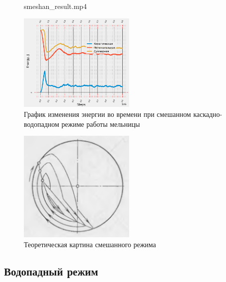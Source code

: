 \documentclass[c]{beamer}  %
\begin{document}
\begin{frame}
\frametitle{\insertsection} 
\framesubtitle{\insertsubsection}

\begin{figure}[ht]
     		{smeshan_result.mp4}
\end{figure}

 {
\begin{figure}[H]
	\centering
	\includegraphics[width=0.5\textwidth]{smeshan_energy} 
	\caption{График изменения энергии во времени при смешанном каскадно-водопадном режиме работы мельницы}
	\label{pic:smeshan_energy}
\end{figure} 
}
{
\begin{figure}[H]
	\centering
	\includegraphics[width=0.5\textwidth]{smeshan_theory} 
	\caption{Теоретическая картина смешанного режима}
\end{figure}
}
\end{frame}





\subsection{Водопадный режим}
\end{document}
